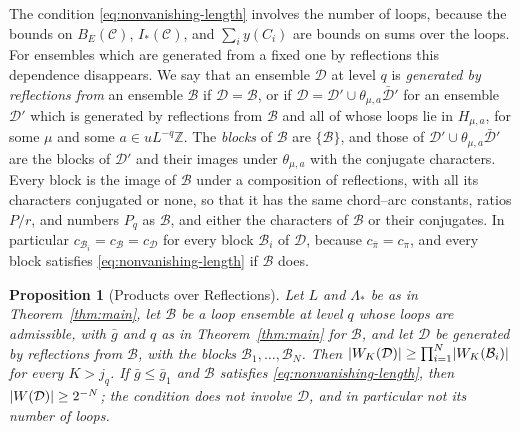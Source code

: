 \documentclass[11pt]{preprint}
\DeclarePairedDelimiter{\abs}{\lvert}{\rvert}
\numberwithin{equation}{section}
\newtheorem{proposition}[theorem]{Proposition}
\theoremstyle{definition}
\theoremstyle{remark}
\theoremstyle{plain}
\begin{document}
The condition \eqref{eq:nonvanishing-length} involves the number of loops, because the bounds on $B_E(\mathcal C)$, $I_*(\mathcal C)$, and $\sum_iy(C_i)$ are bounds on sums over the loops. For ensembles which are generated from a fixed one by reflections this dependence disappears. We say that an ensemble $\mathcal D$ at level $q$ is \emph{generated by reflections from} an ensemble $\mathcal B$ if $\mathcal D = \mathcal B$, or if $\mathcal D = \mathcal D' \cup \theta_{\mu,a}\bar{\mathcal D}'$ for an ensemble $\mathcal D'$ which is generated by reflections from $\mathcal B$ and all of whose loops lie in $H_{\mu,a}$, for some $\mu$ and some $a \in uL^{-q}\mathbb Z$. The \emph{blocks} of $\mathcal B$ are $\{ \mathcal B \}$, and those of $\mathcal D' \cup \theta_{\mu,a}\bar{\mathcal D}'$ are the blocks of $\mathcal D'$ and their images under $\theta_{\mu,a}$ with the conjugate characters. Every block is the image of $\mathcal B$ under a composition of reflections, with all its characters conjugated or none, so that it has the same chord--arc constants, ratios $P/r$, and numbers $P_q$ as $\mathcal B$, and either the characters of $\mathcal B$ or their conjugates. In particular $c_{\mathcal B_i} = c_{\mathcal B} = c_{\mathcal D}$ for every block $\mathcal B_i$ of $\mathcal D$, because $c_{\bar\pi} = c_\pi$, and every block satisfies \eqref{eq:nonvanishing-length} if $\mathcal B$ does.

\begin{proposition}[Products over Reflections]\label{prop:reflection-products}
Let $L$ and $\Lambda_*$ be as in Theorem~\ref{thm:main}, let $\mathcal B$ be a loop ensemble at level $q$ whose loops are admissible, with $\bar g$ and $q$ as in Theorem~\ref{thm:main} for $\mathcal B$, and let $\mathcal D$ be generated by reflections from $\mathcal B$, with the blocks $\mathcal B_1, \dots, \mathcal B_N$. Then $\abs{W_K(\mathcal D)} \geq \prod_{i=1}^{N}\abs{W_K(\mathcal B_i)}$ for every $K > j_q$. If $\bar g \leq \bar g_1$ and $\mathcal B$ satisfies \eqref{eq:nonvanishing-length}, then $\abs{W(\mathcal D)} \geq 2^{-N}$; the condition does not involve $\mathcal D$, and in particular not its number of loops.
\end{proposition}
\end{document}
